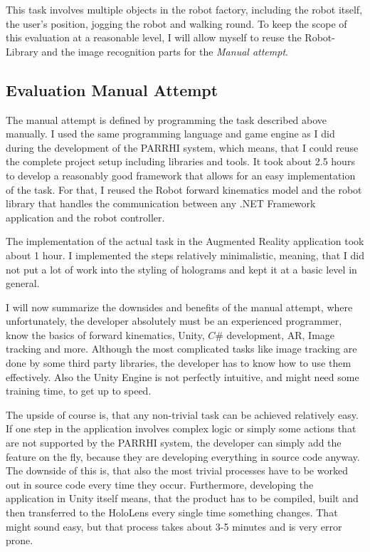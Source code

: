 This task involves multiple objects in the robot factory, including the robot itself, the user's position, jogging the robot and walking round. To keep the scope of this evaluation at a reasonable level, I will allow myself to reuse the Robot-Library and the image recognition parts for the \textit{Manual attempt}. 

\subsection{Evaluation Manual Attempt}

The manual attempt is defined by programming the task described above manually. I used the same programming language and game engine as I did during the development of the PARRHI system, which means, that I could reuse the complete project setup including libraries and tools. It took about 2.5 hours to develop a reasonably good framework that allows for an easy implementation of the task. For that, I reused the Robot forward kinematics model and the robot library that handles the communication between any .NET Framework application and the robot controller. 

The implementation of the actual task in the Augmented Reality application took about 1 hour. I implemented the steps relatively minimalistic, meaning, that I did not put a lot of work into the styling of holograms and kept it at a basic level in general.

I will now summarize the downsides and benefits of the manual attempt, where unfortunately, the developer absolutely must be an experienced programmer, know the basics of forward kinematics, Unity, $C\#$ development, AR, Image tracking and more. Although the most complicated tasks like image tracking are done by some third party libraries, the developer has to know how to use them effectively. Also the Unity Engine is not perfectly intuitive, and might need some training time, to get up to speed.

The upside of course is, that any non-trivial task can be achieved relatively easy. If one step in the application involves complex logic or simply some actions that are not supported by the PARRHI system, the developer can simply add the feature on the fly, because they are developing everything in source code anyway. The downside of this is, that also the most trivial processes have to be worked out in source code every time they occur. Furthermore, developing the application in Unity itself means, that the product has to be compiled, built and then transferred to the HoloLens every single time something changes. That might sound easy, but that process takes about 3-5 minutes and is very error prone.

